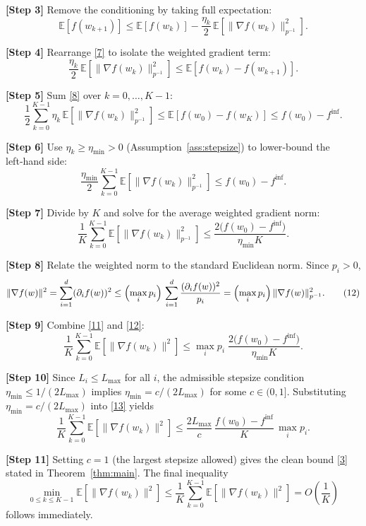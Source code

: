 \documentclass{article}
\newcommand{\E}{\mathbb{E}}
\begin{document}
\noindent\textbf{[Step 3]}  Remove the conditioning by taking full expectation:
\[
\E\!\left[f(w_{k+1})\right]\le \E\!\left[f(w_{k})\right]
-\frac{\eta_{k}}{2}\,\E\!\left[\|\nabla f(w_{k})\|_{p^{-1}}^{2}\right].
\tag{7}
\]

\noindent\textbf{[Step 4]}  Rearrange \eqref{7} to isolate the weighted gradient term:
\[
\frac{\eta_{k}}{2}\,\E\!\left[\|\nabla f(w_{k})\|_{p^{-1}}^{2}\right]
\le \E\!\left[f(w_{k})-f(w_{k+1})\right].
\tag{8}
\]

\noindent\textbf{[Step 5]}  Sum \eqref{8} over $k=0,\dots ,K-1$:
\[
\frac{1}{2}\sum_{k=0}^{K-1}\eta_{k}\,
\E\!\left[\|\nabla f(w_{k})\|_{p^{-1}}^{2}\right]
\le \E\!\left[f(w_{0})-f(w_{K})\right]
\le f(w_{0})-f^{\inf}.
\tag{9}
\]

\noindent\textbf{[Step 6]}  Use $\eta_{k}\ge\eta_{\min}>0$ (Assumption~\ref{ass:stepsize}) to lower‑bound the left‑hand side:
\[
\frac{\eta_{\min}}{2}\sum_{k=0}^{K-1}
\E\!\left[\|\nabla f(w_{k})\|_{p^{-1}}^{2}\right]
\le f(w_{0})-f^{\inf}.
\tag{10}
\]

\noindent\textbf{[Step 7]}  Divide by $K$ and solve for the average weighted gradient norm:
\[
\frac{1}{K}\sum_{k=0}^{K-1}
\E\!\left[\|\nabla f(w_{k})\|_{p^{-1}}^{2}\right]
\le \frac{2\bigl(f(w_{0})-f^{\inf}\bigr)}{\eta_{\min}K}.
\tag{11}
\]

\noindent\textbf{[Step 8]}  Relate the weighted norm to the standard Euclidean norm.
Since $p_{i}>0$,
\[
\|\nabla f(w)\|^{2}
=\sum_{i=1}^{d}(\partial_{i}f(w))^{2}
\le \Bigl(\max_{i}p_{i}\Bigr)\,
\sum_{i=1}^{d}\frac{(\partial_{i}f(w))^{2}}{p_{i}}
= \Bigl(\max_{i}p_{i}\Bigr)\,\|\nabla f(w)\|_{p^{-1}}^{2}.
\tag{12}
\]

\noindent\textbf{[Step 9]}  Combine \eqref{11} and \eqref{12}:
\[
\frac{1}{K}\sum_{k=0}^{K-1}
\E\!\left[\|\nabla f(w_{k})\|^{2}\right]
\le
\max_{i}p_{i}\;
\frac{2\bigl(f(w_{0})-f^{\inf}\bigr)}{\eta_{\min}K}.
\tag{13}
\]

\noindent\textbf{[Step 10]}  Since $L_{i}\le L_{\max}$ for all $i$, the admissible stepsize
condition $\eta_{\min}\le 1/(2L_{\max})$ implies $\eta_{\min}=c/(2L_{\max})$ for some
$c\in(0,1]$.  Substituting $\eta_{\min}=c/(2L_{\max})$ into \eqref{13} yields
\[
\frac{1}{K}\sum_{k=0}^{K-1}
\E\!\left[\|\nabla f(w_{k})\|^{2}\right]
\le
\frac{2L_{\max}}{c}\,
\frac{f(w_{0})-f^{\inf}}{K}\,
\max_{i}p_{i}.
\tag{14}
\]

\noindent\textbf{[Step 11]}  Setting $c=1$ (the largest stepsize allowed) gives the
clean bound \eqref{3} stated in Theorem~\ref{thm:main}.  The final inequality
\[
\min_{0\le k\le K-1}\E\!\left[\|\nabla f(w_{k})\|^{2}\right]
\le\frac{1}{K}\sum_{k=0}^{K-1}
\E\!\left[\|\nabla f(w_{k})\|^{2}\right]
=O\!\left(\frac{1}{K}\right)
\]
follows immediately.
\end{document}
